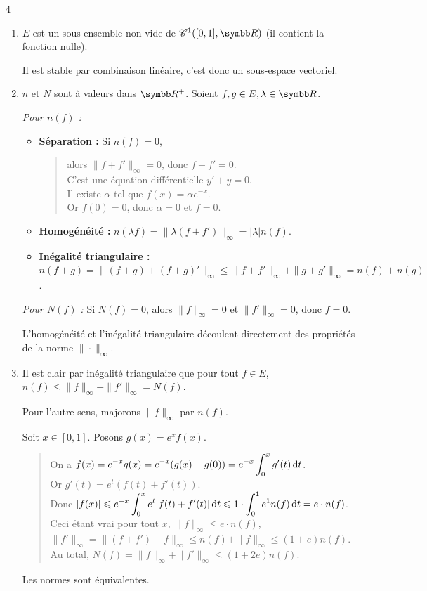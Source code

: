 \newpage
\begin{correction}{4}
\begin{enumerate}
    \item $E$ est un sous-ensemble non vide de $\mathscr C^1([0,1], \R)$ (il contient la fonction nulle). 
    
    Il est stable par combinaison linéaire, c'est donc un sous-espace vectoriel.

    \item $n$ et $N$ sont à valeurs dans $\R^+$. Soient $f,g \in E, \lambda \in \R$.

    \textit{Pour $n(f)$ :}
    \begin{itemize}
        \item \textbf{Séparation :} Si $n(f)=0$,
        \begin{quote}
            alors $\|f+f'\|_\infty = 0$, donc $f+f'=0$. \\
            C'est une équation différentielle $y' + y = 0$. \\
            Il existe $\alpha$ tel que $f(x) = \alpha e^{-x}$. \\
            Or $f(0)=0$, donc $\alpha=0$ et $f=0$.
        \end{quote}
        \item \textbf{Homogénéité :} $n(\lambda f) = \|\lambda(f+f')\|_\infty = |\lambda| n(f)$.
        \item \textbf{Inégalité triangulaire :} $n(f+g) = \|(f+g) + (f+g)'\|_\infty \leqslant \|f+f'\|_\infty + \|g+g'\|_\infty = n(f) + n(g)$.
    \end{itemize}

    \textit{Pour $N(f)$ :}
    Si $N(f)=0$, alors $\|f\|_\infty = 0$ et $\|f'\|_\infty = 0$, donc $f=0$. 
    
    L'homogénéité et l'inégalité triangulaire découlent directement des propriétés de la norme $\|\cdot\|_\infty$.

    \item Il est clair par inégalité triangulaire que pour tout $f \in E$, $n(f) \leqslant \|f\|_\infty + \|f'\|_\infty = N(f)$.

    Pour l'autre sens, majorons $\|f\|_\infty$ par $n(f)$.
    
    Soit $x \in [0,1]$. Posons $g(x) = e^x f(x)$. 
    \begin{quote}
        On a $\displaystyle f(x) = e^{-x} g(x) = e^{-x} (g(x)-g(0)) = e^{-x} \int_0^x g'(t) \,\mathrm{d}t$. \\
        Or $g'(t) = e^t (f(t)+f'(t))$. \\
        Donc $\displaystyle |f(x)| \leqslant e^{-x} \int_0^x e^t |f(t)+f'(t)| \,\mathrm{d}t \leqslant 1 \cdot \int_0^1 e^1 n(f) \,\mathrm{d}t = e \cdot n(f)$. \\
        Ceci étant vrai pour tout $x$, $\|f\|_\infty \le e \cdot n(f)$,
        $\|f'\|_\infty = \|(f+f') - f\|_\infty \leqslant n(f) + \|f\|_\infty \leqslant (1+e)n(f)$. \\
        Au total, $N(f) = \|f\|_\infty + \|f'\|_\infty \leqslant (1+2e) n(f)$. 
    \end{quote}
    Les normes sont équivalentes.
\end{enumerate}
\end{correction}

